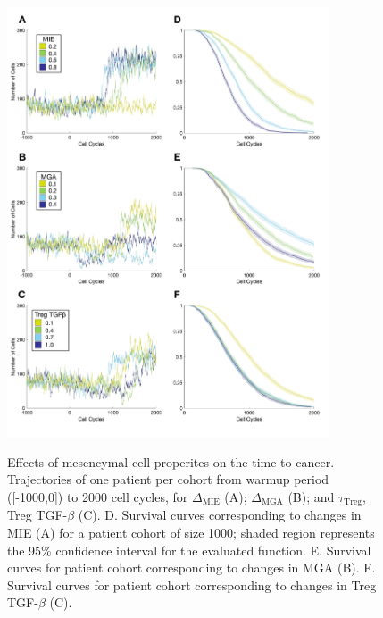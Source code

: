 \documentclass[11pt]{article}
\begin{document}
\begin{figure}
\center
{\includegraphics[width=0.85\textwidth]{Figure3/Figure3.pdf}}
\caption{Effects of mesencymal cell properites on the time to cancer. Trajectories of one patient per cohort from warmup period ([-1000,0]) to 2000 cell cycles, for $\Delta_\text{MIE}$ (A); $\Delta_\text{MGA}$ (B); and $\tau_\text{Treg}$, Treg TGF-$\beta$ (C). 
D. Survival curves corresponding to changes in MIE (A) for a patient cohort of size 1000; shaded region represents the 95\% confidence interval for the evaluated function. 
E. Survival curves for patient cohort corresponding to changes in MGA (B).
F. Survival curves for patient cohort corresponding to changes in Treg TGF-$\beta$ (C). 
}
\label{fig:FirstSurvivalCurves}
\end{figure}
\end{document}
